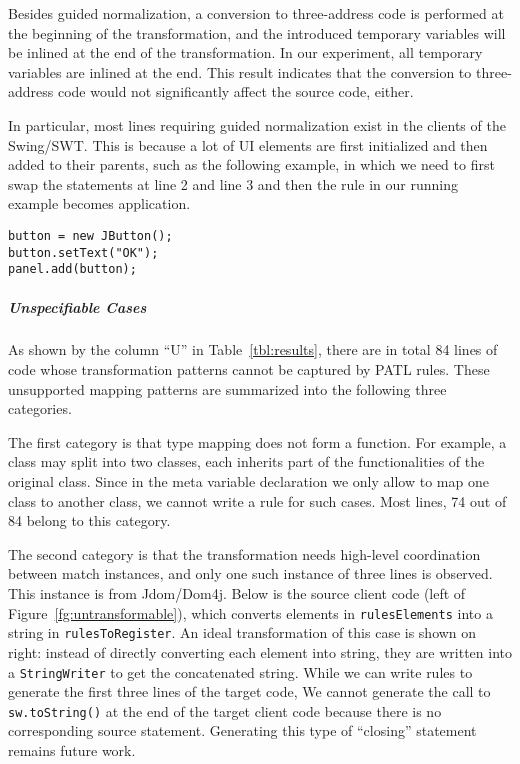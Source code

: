 \documentclass[letterpaper, USenglish]{lipics-v2016}
\newenvironment{smpage}[1]
{\begin{lrbox}{\fmbox}\begin{minipage}{#1}}
{\end{minipage}\end{lrbox}\usebox{\fmbox}}
\newcommand{\code}[1]{\texttt{\footnotesize #1}}
\newcommand{\PATL}{PATL\xspace}
\theoremstyle{plain}
\begin{document}
Besides guided normalization, a conversion to three-address code is
performed at the beginning of the transformation, and the introduced
temporary variables will be inlined at the end of the transformation.
In our experiment, all temporary variables are inlined at the end.
This result indicates that the conversion to three-address code would
not significantly affect the source code, either.

In particular,
most lines requiring guided normalization exist in the clients of the
Swing/SWT. This is because a lot of UI elements are first initialized
and then added to their parents, such as the following example, in which we need to first swap the statements at line 2 and line
3 and then the rule in our running example %
becomes application.
\begin{center}
\begin{smpage}{0.3\columnwidth}
\begin{lstlisting}[style=java,frame=none,numbers=none,basicstyle=\ttfamily\scriptsize]
button = new JButton();
button.setText("OK");
panel.add(button);
\end{lstlisting}
\end{smpage}
\end{center}

\subparagraph*{Unspecifiable Cases}
As shown by the column ``U'' in Table~\ref{tbl:results}, there are in
total 84 lines of code whose transformation patterns cannot be
captured by \PATL rules. These unsupported mapping patterns are
summarized into the following three categories.

The first category is that type mapping does not form a function. For example, a class may split into two classes, each inherits part of the functionalities of the original class. Since in the meta variable declaration we only allow to map one class to another class, we cannot write a rule for such cases. Most lines, 74 out of 84 belong to this category. 

The second category is that the transformation needs high-level
coordination between match instances, and only one such instance of
three lines is observed. This instance is from Jdom/Dom4j. Below is the source client code (left of Figure~\ref{fg:untransformable}), which converts elements in \code{rulesElements} into a string in \code{rulesToRegister}. An ideal transformation of this case is shown on right: instead of
directly converting each element into string, they are written into
a \code{StringWriter} to get the concatenated string. While we can write rules to generate the first three lines of the
target code, We cannot generate the call to \code{sw.toString()} at
the end of the target client code because there is no corresponding
source statement. Generating this type of ``closing'' statement
remains future work.
\end{document}
